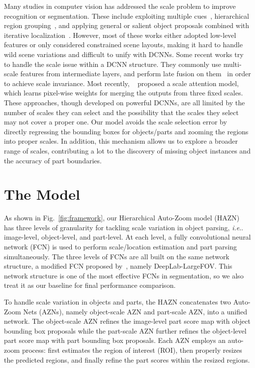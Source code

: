 \documentclass[runningheads]{llncs}
\makeatletter
\DeclareRobustCommand\onedot{\futurelet\@let@token\@onedot}
\def\@onedot{\ifx\@let@token.\else.\null\fi\xspace}
\def\ie{\emph{i.e}\onedot} \def\Ie{\emph{I.e}\onedot}
\makeatother
\begin{document}
Many studies in computer vision has addressed the scale problem to improve recognition or segmentation. These include exploiting multiple cues~\cite{DBLP:journals/ijcv/HoiemEH08}, hierarchical region grouping~\cite{arbelaez2011contour,florack1996gaussian}, and applying general or salient object proposals combined with iterative localization~\cite{DBLP:journals/pami/AlexeDF12,Yukun_CVPR15,DBLP:conf/cvpr/WangWZFZL12}.
However, most of these works either adopted low-level features or only considered constrained scene layouts, making it hard  to handle wild scene variations and difficult to unify with DCNNs. Some recent works try to handle the scale issue within a DCNN structure. They commonly use multi-scale features from intermediate layers, and perform late fusion on them~\cite{long2014fully,hariharan2014hypercolumns,chen2014semantic} in order to achieve scale invariance. Most recently, ~\cite{chen2015attention} proposed a scale attention model, which learns pixel-wise weights for merging the outputs from three fixed scales. These approaches, though developed on powerful DCNNs, are all limited by the number of scales they can select and the possibility that the scales they select may not cover a proper one. Our model avoids the scale selection error by directly regressing the bounding boxes for objects/parts and zooming the regions into proper scales. In addition, this mechanism allows us to explore a broader range of scales, contributing a lot to the discovery of missing object instances and the accuracy of part boundaries.





\section{The Model}
As shown in Fig.~\ref{fig:framework}, our Hierarchical Auto-Zoom model (HAZN) has three levels of granularity for tackling scale variation in object parsing, \ie image-level, object-level, and part-level. At each level, a fully convolutional neural network (FCN) is used to perform scale/location estimation and part parsing simultaneously. The three levels of FCNs are all built on the same network structure, a modified FCN proposed by~\cite{chen2014semantic}, namely DeepLab-LargeFOV. This network structure is one of the most effective FCNs in segmentation, so we also treat it as our baseline for final performance comparison.

To handle scale variation in objects and parts, the HAZN concatenates two Auto-Zoom Nets (AZNs), namely object-scale AZN and part-scale AZN, into a unified network. The object-scale AZN refines the image-level part score map with object bounding box proposals while the part-scale AZN further refines the object-level part score map with part bounding box proposals. Each AZN employs an auto-zoom process: first estimates the region of interest (ROI), then properly resizes the predicted regions, and finally refine the part scores within the resized regions.
\end{document}
